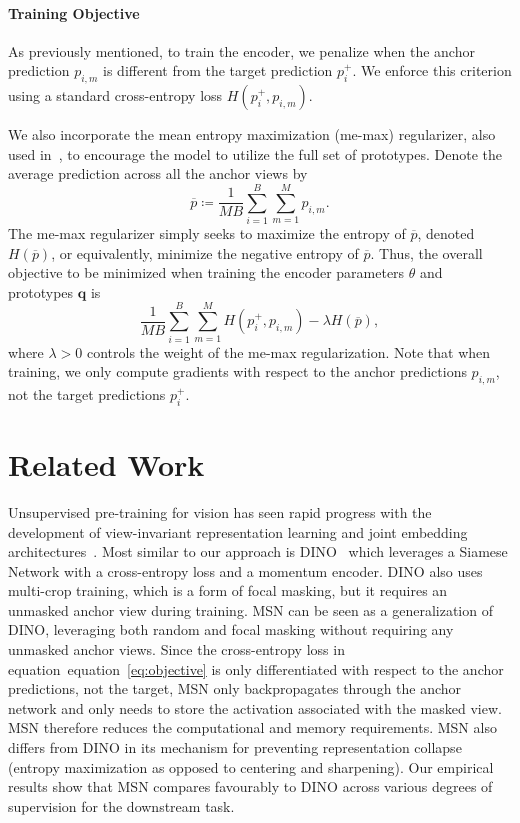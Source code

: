 \documentclass{article}
\newcommand{\defeq}{\coloneqq}
\def\eqref#1{equation~\ref{#1}}
\begin{document}
\paragraph{Training Objective} 
As previously mentioned, to train the encoder, we penalize when the anchor prediction $p_{i,m}$ is different from the target prediction $p_i^+$. 
We enforce this criterion using a standard cross-entropy loss $H(p^+_i, p_{i,m})$.

We also incorporate the mean entropy maximization ({\sc me-max}) regularizer, also used in~\citep{assran2021semi,joulin2012convex}, to encourage the model to utilize the full set of prototypes.
Denote the average prediction across all the anchor views by
\[ 
    \overline{p} \defeq \frac{1}{MB}\sum^B_{i=1}\sum^M_{m=1} p_{i,m}.
\]
The {\sc me-max} regularizer simply seeks to maximize the entropy of $\overline{p}$, denoted $H(\overline{p})$, or equivalently, minimize the negative entropy of $\overline{p}$.
Thus, the overall objective to be minimized when training the encoder parameters $\theta$ and prototypes $\mathbf{q}$ is
\begin{equation}
    \label{eq:objective}
    \frac{1}{MB} \sum^B_{i=1}\sum^M_{m=1} H(p^+_i, p_{i,m}) - \lambda H(\overline{p}),
\end{equation}
where $\lambda > 0$ controls the weight of the  {\sc me-max} regularization.
Note that when training, we only compute gradients with respect to the anchor predictions $p_{i,m}$, not the target predictions $p^+_i$.

\section{Related Work}
\label{sec:related-work}

Unsupervised pre-training for vision has seen rapid progress  with the development of view-invariant representation learning and joint embedding architectures~\citep{wu2018unsupervised,he2019moco,chen2020exploring,grill2020bootstrap,caron2021emerging,bardes2021vicreg}.
Most similar to our approach is DINO~\citep{caron2021emerging} which leverages a Siamese Network with a cross-entropy loss and a momentum encoder.
DINO also uses multi-crop training, which is a form of focal masking, but it requires an unmasked anchor view during training.
MSN can be seen as a generalization of DINO, leveraging both random and focal masking without requiring any unmasked anchor views. Since the cross-entropy loss in equation~\eqref{eq:objective} is only differentiated with respect to the anchor predictions, not the target, MSN only backpropagates through the anchor network and only needs to store the activation associated with the masked view. MSN therefore reduces the computational and memory requirements.
MSN also differs from DINO in its mechanism for preventing representation collapse (entropy maximization as opposed to centering and sharpening).
Our empirical results show that MSN compares favourably to DINO across various degrees of supervision for the downstream task.
\end{document}
